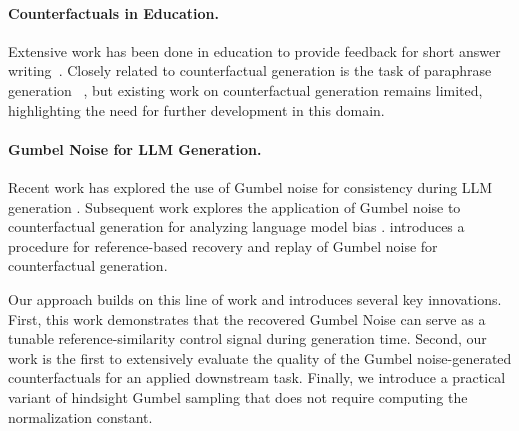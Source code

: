 \documentclass[11pt]{article}
\newcommand{\mh}[1]{\textcolor{teal}{\bf [Hunter: #1]}}
\begin{document}
\paragraph{Counterfactuals in Education.} Extensive work has been done in education to provide feedback for short answer writing~\cite{filighera_your_2022, mcnichols_can_2024, scarlatos_improving_2024}. Closely related to counterfactual generation is the task of paraphrase generation ~\cite{ouahrani_paraphrase_2024}, but existing work on counterfactual generation remains limited, highlighting the need for further development in this domain.  




\paragraph{Gumbel Noise for LLM Generation.} Recent work has explored the use of Gumbel noise for consistency during LLM generation \cite{de_mijolla_waste_2025}. Subsequent work explores the application of Gumbel noise to counterfactual generation for analyzing language model bias \cite{chatzi2025counterfactual}. \citet{ravfogel2025gumbel} introduces a procedure for reference-based recovery and replay of Gumbel noise for counterfactual generation. 

Our approach builds on this line of work and introduces several key innovations. First, this work demonstrates that the recovered Gumbel Noise can serve as a tunable reference-similarity control signal during generation time. Second, our work is the first to extensively evaluate the quality of the Gumbel noise-generated counterfactuals for an applied downstream task. Finally, we introduce a practical variant of hindsight Gumbel sampling that does not require computing the normalization constant. 


\end{document}
